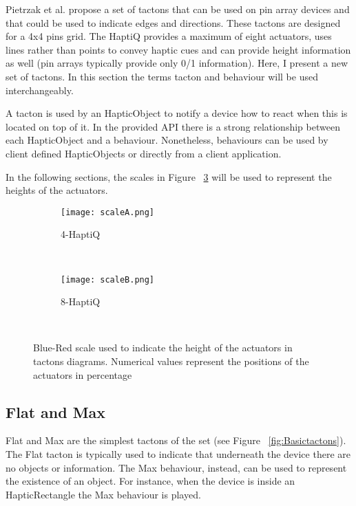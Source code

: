 Pietrzak et al. \cite{pietrzak2009creating} propose a set of tactons that can be used on pin array devices and that could be used to indicate edges and directions. These tactons are designed for a 4x4 pins grid. The HaptiQ provides a maximum of eight actuators, uses lines rather than points to convey haptic cues and can provide height information as well (pin arrays typically provide only 0/1 information). Here, I present a new set of tactons. In this section the terms tacton and behaviour will be used interchangeably.

A tacton is used by an HapticObject to notify a device how to react when this is located on top of it. In the provided API there is a strong relationship between each HapticObject and a behaviour. Nonetheless, behaviours can be used by client defined HapticObjects or directly from a client application.

In the following sections, the scales in Figure ~\ref{fig:scales} will be used to represent the heights of the actuators.

\begin{figure}[H]
        \centering
        \begin{subfigure}[H]{0.7\textwidth}
                \texttt{[image: scaleA.png]}
                \caption{4-HaptiQ}
                \label{fig:scale-4}
        \end{subfigure}%
        ~ %
          
        \begin{subfigure}[H]{0.7\textwidth}
                \texttt{[image: scaleB.png]}
                \caption{8-HaptiQ}
                \label{fig:scale-8}
        \end{subfigure}
        ~ %
        \caption{Blue-Red scale used to indicate the height of the actuators in tactons diagrams. Numerical values represent the positions of the actuators in percentage}
        \label{fig:scales}
\end{figure}

\subsection{Flat and Max}

Flat and Max are the simplest tactons of the set (see Figure ~\ref{fig:Basictactons}). The Flat tacton is typically used to indicate that underneath the device there are no objects or information. The Max behaviour, instead, can be used to represent the existence of an object. For instance, when the device is inside an HapticRectangle the Max behaviour is played. 

